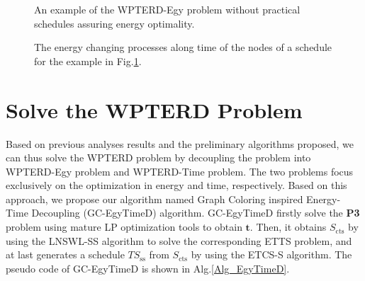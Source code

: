 \documentclass[journal,10pt]{IEEEtran}
\begin{document}
\begin{figure}[htb]
\caption{An example of the WPTERD-Egy problem without practical schedules assuring energy optimality.}
\label{fig_full}
\end{figure}

\vspace{-4mm}
\begin{figure}[htb]
\caption{The energy changing processes along time of the nodes of a schedule for the example in Fig.\ref{fig_full}.}
\label{fig_full_sch}
\end{figure}

\section{Solve the WPTERD Problem}
\label{sec_algcombin}
Based on previous analyses results and the preliminary algorithms proposed, we can thus solve the WPTERD problem by decoupling the problem into WPTERD-Egy problem and WPTERD-Time problem. The two problems focus exclusively on the optimization in energy and time, respectively. Based on this approach, we propose our algorithm named Graph Coloring inspired Energy-Time Decoupling (GC-EgyTimeD) algorithm. GC-EgyTimeD firstly solve the \textbf{P3} problem using mature LP optimization tools to obtain $\mathbf{t}$. Then, it obtains $S_\text{cts}$ by using the LNSWL-SS algorithm to solve the corresponding ETTS problem, and at last generates a schedule $TS_\text{ss}$ from $S_\text{cts}$ by using the ETCS-S algorithm. The pseudo code of GC-EgyTimeD is shown in Alg.\ref{Alg_EgyTimeD}.
\end{document}
